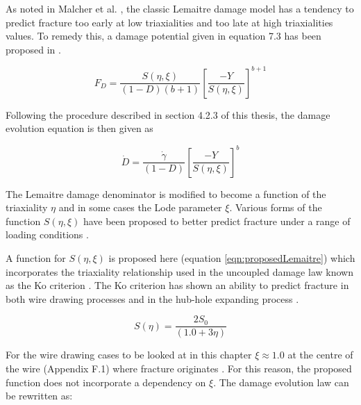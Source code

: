 \documentclass[sn-mathphys,Numbered,draft]{sn-jnl}%
\begin{document}
As noted in Malcher et al. \cite{malcher_improved_2014}, the classic Lemaitre damage model has a tendency to predict fracture too early at low triaxialities and too late at high triaxialities values. To remedy this, a damage potential given in equation 7.3 has been  proposed in \citet{malcher_improved_2014}.

\begin{equation}
	F_{D}=\frac{S(\eta,\xi)}{\left(1-D\right)\left(b+1\right)}\left[\frac{-Y}{S(\eta,\xi)}\right]^{b+1}
\end{equation}

 Following the procedure described in section 4.2.3 of this thesis, the damage evolution equation is then given as

 \begin{equation}
	\dot{D}=\frac{\dot{\gamma}}{\left(1-D\right)}\left[\frac{-Y}{S(\eta,\xi)}\right]^b
\end{equation}

The Lemaitre damage denominator is modified to become a function of the triaxiality $\eta$ and in some cases the Lode parameter $\xi$. Various forms of the function $S(\eta,\xi)$ have been proposed to better predict fracture under a range of loading conditions \cite{ferreira_improved_2022,castro_calibration_2018}. 

A function for $S(\eta,\xi)$ is proposed here (equation \ref{eqn:proposedLemaitre}) which incorporates the triaxiality relationship used in the uncoupled damage law known as the Ko criterion \cite{ko_prediction_2007}. The Ko criterion has shown an ability to predict fracture in both wire drawing processes \cite{roh_process_2021} and in the hub-hole expanding process \cite{ko_prediction_2007}.

\begin{equation}
\label{eqn:proposedLemaitre}
S(\eta)=\frac{2S_0}{\left(1.0+3\eta\right)}
\end{equation}

For the wire drawing cases to be looked at in this chapter $\xi\approx1.0$ at the centre of the wire (Appendix F.1) where fracture originates \cite{roh_process_2021}. For this reason, the proposed function does not incorporate a dependency on $\xi$. The damage evolution law can be rewritten as:


\end{document}
